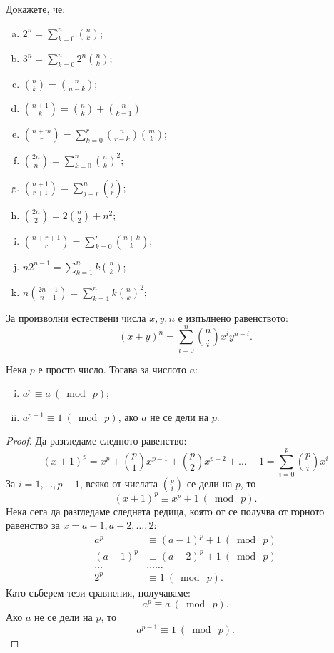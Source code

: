 \begin{prb}
  Докажете, че:
  \begin{enumerate}[a)]
  \item
    $2^n = \sum^n_{k=0}\binom{n}{k}$;
  \item
    $3^n = \sum^n_{k=0}2^n\binom{n}{k}$;
  \item
    $\binom{n}{k} = \binom{n}{n-k}$;
  \item
    $\binom{n+1}{k} = \binom{n}{k} + \binom{n}{k-1}$
  \item 
    $\binom{n+m}{r} = \sum^r_{k=0}\binom{n}{r-k}\binom{m}{k}$;
  \item
    $\binom{2n}{n} = \sum^n_{k=0}\binom{n}{k}^2$;
  \item
    $\binom{n+1}{r+1} = \sum^n_{j=r}\binom{j}{r}$;
  \item
    $\binom{2n}{2} = 2\binom{n}{2} + n^2$;
  \item
    $\binom{n+r+1}{r} = \sum^r_{k=0}\binom{n+k}{k}$;
  \item
    $n2^{n-1} = \sum^{n}_{k=1} k\binom{n}{k}$;
  \item
    $n\binom{2n-1}{n-1} = \sum^{n}_{k=1}k\binom{n}{k}^2$;
  \end{enumerate}
\end{prb}

\begin{thm}
  За произволни естествени числа $x,y,n$ е изпълнено равенството:
  \[(x+y)^n = \sum^{n}_{i=0}\binom{n}{i}x^iy^{n-i}.\]
\end{thm}
\begin{cor}
  Нека $p$ е просто число. Тогава за числото $a$:
  \begin{enumerate}[i)]
  \item
    $a^p \equiv a\ (\bmod\ p)$;
  \item 
    $a^{p-1} \equiv 1\ (\bmod\ p)$, ако $a$ не се дели на $p$.
  \end{enumerate}
\end{cor}
\begin{proof}
  Да разгледаме следното равенство:
  \[(x+1)^p = x^p + \binom{p}{1}x^{p-1} + \binom{p}{2}x^{p-2} + \dots + 1 = \sum^{p}_{i=0}\binom{p}{i}x^i\]
  За $i = 1,\dots,p-1$, всяко от числата $\binom{p}{i}$ се дели на $p$, то 
  \[(x+1)^p \equiv x^p + 1\ (\bmod\ p).\]
  Нека сега да разгледаме следната редица, която от се получва от горното равенство за $x = a-1,a-2,\dots,2$:
  \begin{align*}
    a^p & \equiv (a-1)^p+1\ (\bmod\ p)\\
    (a-1)^p & \equiv (a-2)^p+1\ (\bmod\ p)\\
    \dots & \dots\dots\\
    2^p & \equiv 1\ (\bmod\ p).
  \end{align*}
  Като съберем тези сравнения, получаваме:
  \[a^p \equiv a\ (\bmod\ p).\]
  Ако $a$ не се дели на $p$, то
  \[a^{p-1} \equiv 1\ (\bmod\ p).\]
\end{proof}




